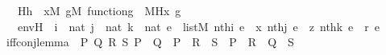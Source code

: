 \begin{isabellebody}
\ \ \ Hh\ {\isacharcolon}{\kern0pt}\ {\isachardoublequoteopen}{\isacharparenleft}{\kern0pt}{\isasymforall}x{\isacharbrackleft}{\kern0pt}{\isacharhash}{\kern0pt}{\isacharhash}{\kern0pt}M{\isacharbrackright}{\kern0pt}{\isachardot}{\kern0pt}\ {\isasymforall}g{\isacharbrackleft}{\kern0pt}{\isacharhash}{\kern0pt}{\isacharhash}{\kern0pt}M{\isacharbrackright}{\kern0pt}{\isachardot}{\kern0pt}\ function{\isacharparenleft}{\kern0pt}g{\isacharparenright}{\kern0pt}\ {\isasymlongrightarrow}\ {\isacharparenleft}{\kern0pt}{\isacharhash}{\kern0pt}{\isacharhash}{\kern0pt}M{\isacharparenright}{\kern0pt}{\isacharparenleft}{\kern0pt}H{\isacharparenleft}{\kern0pt}x{\isacharcomma}{\kern0pt}\ g{\isacharparenright}{\kern0pt}{\isacharparenright}{\kern0pt}{\isacharparenright}{\kern0pt}{\isachardoublequoteclose}\ \isanewline
\ \ \ envH\ {\isacharcolon}{\kern0pt}\ {\isachardoublequoteopen}i\ {\isasymin}\ nat{\isachardoublequoteclose}\ {\isachardoublequoteopen}j\ {\isasymin}\ nat{\isachardoublequoteclose}\ {\isachardoublequoteopen}k\ {\isasymin}\ nat{\isachardoublequoteclose}\ {\isachardoublequoteopen}e\ {\isasymin}\ list{\isacharparenleft}{\kern0pt}M{\isacharparenright}{\kern0pt}{\isachardoublequoteclose}\ {\isachardoublequoteopen}nth{\isacharparenleft}{\kern0pt}i{\isacharcomma}{\kern0pt}\ e{\isacharparenright}{\kern0pt}\ {\isacharequal}{\kern0pt}\ x{\isachardoublequoteclose}\ {\isachardoublequoteopen}nth{\isacharparenleft}{\kern0pt}j{\isacharcomma}{\kern0pt}\ e{\isacharparenright}{\kern0pt}\ {\isacharequal}{\kern0pt}\ z{\isachardoublequoteclose}\ {\isachardoublequoteopen}nth{\isacharparenleft}{\kern0pt}k{\isacharcomma}{\kern0pt}\ e{\isacharparenright}{\kern0pt}\ {\isacharequal}{\kern0pt}\ r{\isachardoublequoteclose}\ {\isachardoublequoteopen}e\ {\isasymnoteq}\ {\isacharbrackleft}{\kern0pt}{\isacharbrackright}{\kern0pt}{\isachardoublequoteclose}\isanewline
\isanewline
\ \ \isamarkupfalse%
\ iff{\isacharunderscore}{\kern0pt}conj{\isacharunderscore}{\kern0pt}lemma\ {\isacharcolon}{\kern0pt}\ {\isachardoublequoteopen}{\isasymAnd}P\ Q\ R\ S{\isachardot}{\kern0pt}\ P\ {\isasymlongleftrightarrow}\ Q\ {\isasymLongrightarrow}\ {\isacharparenleft}{\kern0pt}P\ {\isasymLongrightarrow}\ {\isacharparenleft}{\kern0pt}R\ {\isasymlongleftrightarrow}\ S{\isacharparenright}{\kern0pt}{\isacharparenright}{\kern0pt}\ {\isasymLongrightarrow}\ {\isacharparenleft}{\kern0pt}P\ {\isasymand}\ R{\isacharparenright}{\kern0pt}\ {\isasymlongleftrightarrow}\ {\isacharparenleft}{\kern0pt}Q\ {\isasymand}\ S{\isacharparenright}{\kern0pt}{\isachardoublequoteclose}\ \isamarkupfalse%

\end{isabellebody}
